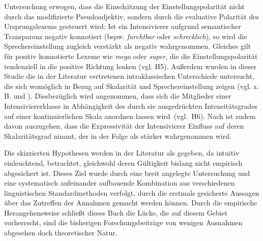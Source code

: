 Untersuchung erwogen, dass die Einschätzung der Einstellungspolarität nicht durch das modifizierte Pseudoadjektiv, sondern durch die evaluative Polarität des Ursprungslexems gesteuert wird: Ist ein Intensivierer aufgrund semantischer Transparenz negativ konnotiert (bspw. \textit{furchtbar} oder \textit{schrecklich}), so wird die Sprechereinstellung zugleich verstärkt als negativ wahrgenommen. Gleiches gilt für positiv konnotierte Lexeme wie \textit{mega} oder \textit{super}, die die Einstellungspolarität tendenziell in die positive Richtung lenken (vgl. H5). Außerdem wurden in dieser Studie die in der Literatur vertretenen intraklassischen Unterschiede untersucht, die sich womöglich in Bezug auf Skalarität und Sprechereinstellung zeigen (vgl. z.\,B. \citealt[87]{Biedermann.1969} und \mbox{\citealt[408]{Breindl.2007}}). Diesbezüglich wird angenommen, dass sich die Mitglieder einer Intensiviererklasse in Abhängigkeit des durch sie ausgedrückten Intensitätsgrades auf einer kontinuierlichen Skala anordnen lassen \mbox{wird (vgl. H6)}. Nach \mbox{\citet[133]{Gutzmann.2019a}} ist zudem davon auszugehen, dass die Expressivität der Intensivierer Einfluss auf deren Skalaritätsgrad nimmt, der in der Folge als stärker wahrgenommen wird. \par
Die skizzierten Hypothesen werden in der Literatur als gegeben, da intuitiv einleuchtend, betrachtet, gleichwohl deren Gültigkeit bislang nicht empirisch abgesichert ist. Dieses Ziel wurde durch eine breit angelegte Untersuchung und eine systematisch aufeinander aufbauende Kombination aus verschiedenen linguistischen Standardmethoden verfolgt, durch die erstmals gesicherte Aussagen über das Zutreffen der Annahmen gemacht werden können. Durch die empirische Herangehensweise schließt dieses Buch die Lücke, die auf diesem Gebiet vorherrscht, sind die bisherigen Forschungsbeiträge von wenigen Ausnahmen abgesehen doch theoretischer Natur.


